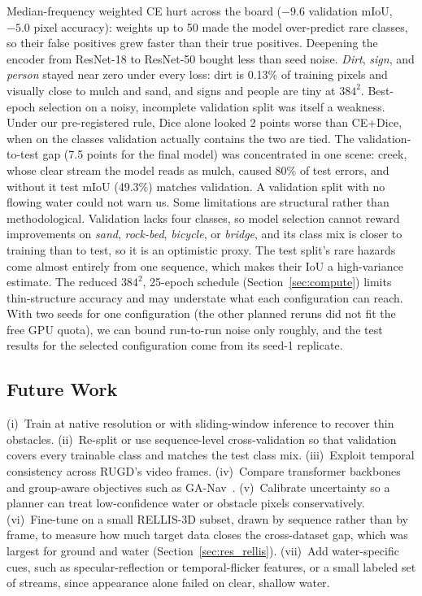 Median-frequency weighted CE hurt across the board ($-9.6$ validation mIoU,
$-5.0$ pixel accuracy): weights up to 50 made the model over-predict rare
classes, so their false positives grew faster than their true positives.
Deepening the encoder from ResNet-18 to ResNet-50 bought less than seed
noise. \emph{Dirt}, \emph{sign}, and \emph{person} stayed near zero under
every loss: dirt is 0.13\% of training pixels and visually close to mulch and
sand, and signs and people are tiny at $384^2$. Best-epoch selection on a
noisy, incomplete validation split was itself a weakness. Under our
pre-registered rule, Dice alone looked 2 points worse than CE+Dice, when on
the classes validation actually contains the two are tied. The validation-to-test gap (7.5 points for the final model) was
concentrated in one scene: creek, whose clear stream the model reads as mulch,
caused 80\% of test errors, and without it test mIoU (49.3\%) matches
validation. A validation split with no flowing water could not warn us. Some limitations
are structural rather than methodological. Validation lacks four classes, so
model selection cannot reward improvements on \emph{sand}, \emph{rock-bed},
\emph{bicycle}, or \emph{bridge}, and its class mix is closer to training
than to test, so it is an optimistic proxy. The test split's rare hazards come
almost entirely from one sequence, which makes their IoU a high-variance
estimate. The reduced $384^2$, 25-epoch schedule
(Section~\ref{sec:compute}) limits thin-structure accuracy and may understate
what each configuration can reach. With two seeds for one
configuration (the other planned reruns did not fit the free GPU quota),
we can bound run-to-run noise only roughly, and the test results for the
selected configuration come from its seed-1 replicate.

\subsection{Future Work}

(i)~Train at native resolution or with sliding-window inference to recover
thin obstacles. (ii)~Re-split or use sequence-level cross-validation so that
validation covers every trainable class and matches the test class mix.
(iii)~Exploit temporal consistency across RUGD's video frames. (iv)~Compare
transformer backbones and group-aware objectives such as
GA-Nav~\cite{guan2022ganav}. (v)~Calibrate uncertainty so a planner can treat
low-confidence water or obstacle pixels conservatively. (vi)~Fine-tune on a
small RELLIS-3D subset, drawn by sequence rather than by frame, to measure how
much target data closes the cross-dataset gap, which was largest for ground
and water (Section~\ref{sec:res_rellis}). (vii)~Add water-specific cues, such
as specular-reflection or temporal-flicker features, or a small labeled set
of streams, since appearance alone failed on clear, shallow water.
